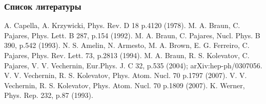 \documentclass{beamer}
\begin{document}
\begin{frame}[fragile]
\frametitle{Список литературы}
{\small
\begin{thebibliography}{00}
A. Capella, A. Krzywicki, Phys. Rev. D 18 p.4120 (1978).
M. A. Braun, C. Pajares, Phys. Lett. B 287, p.154 (1992).
M. A. Braun, C. Pajares, Nucl. Phys. B 390, p.542 (1993).
N. S. Amelin, N. Armesto, M. A. Brown, E. G. Ferreiro, C. Pajares, Phys. Rev. Lett. 73, p.2813 (1994).
M. A. Braun, R. S. Kolevatov, C. Pajares, V. V. Vechernin, Eur.Phys. J. C 32, p.535 (2004); arXiv:hep-ph/0307056.
V. V. Vechernin, R. S. Kolevatov, Phys. Atom. Nucl. 70 p.1797 (2007).
V. V. Vechernin, R. S. Kolevatov, Phys. Atom. Nucl. 70 p.1809 (2007).
K. Werner, Phys. Rep. 232, p.87 (1993).
\end{thebibliography}
}
\end{frame}
\end{document}
